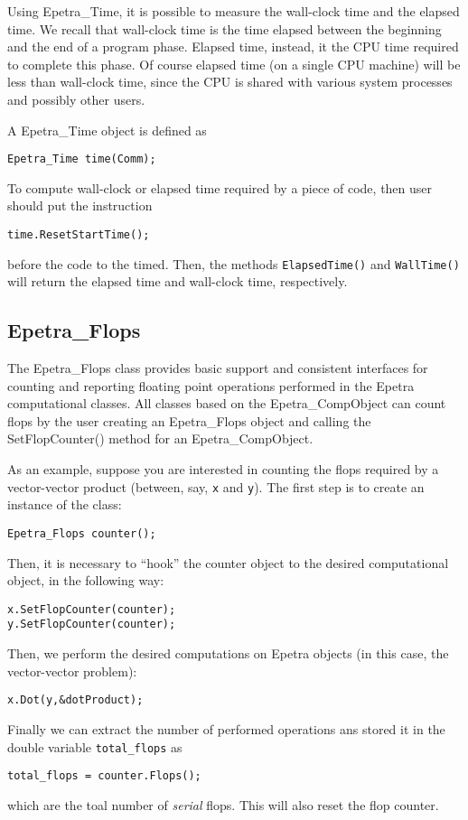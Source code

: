 Using Epetra\_Time, it is possible to measure the wall-clock time and
the elapsed time. We recall that wall-clock time is the time elapsed
between the beginning and the end of a program phase. Elapsed time,
instead, it the CPU time required to complete this phase. Of course
elapsed time (on a single CPU machine) will be less than wall-clock
time, since the CPU is shared with various system processes and possibly
other users.

A Epetra\_Time object is defined as
\begin{verbatim}
Epetra_Time time(Comm);
\end{verbatim}
To compute wall-clock or elapsed time required by a piece of code,
then user should put the instruction
\begin{verbatim}
time.ResetStartTime();
\end{verbatim}
before the code to the timed. Then, 
the methods \verb!ElapsedTime()! and \verb!WallTime()! will return the
elapsed time and wall-clock time, respectively.


\subsection{Epetra\_Flops}
\label{sec:flops}

The Epetra\_Flops class provides basic support and consistent interfaces
for counting and reporting floating point operations performed in the
Epetra computational classes. All classes based on the
Epetra\_CompObject can count flops by the user creating an Epetra\_Flops
object and calling the SetFlopCounter() method for an
Epetra\_CompObject.

As an example, suppose you are interested in counting the flops required
by a vector-vector product (between, say, \verb!x! and \verb!y!).  The
first step is to create an instance of the class:
\begin{verbatim}
Epetra_Flops counter();
\end{verbatim}
Then, it is necessary to ``hook'' the counter object to the desired
computational object, in the following way:
\begin{verbatim}
x.SetFlopCounter(counter);
y.SetFlopCounter(counter);
\end{verbatim}
Then, we perform the desired computations on Epetra objects (in this
case, the vector-vector problem):
\begin{verbatim}
x.Dot(y,&dotProduct);
\end{verbatim}
Finally we can extract the number of performed operations ans stored it
in the double variable \verb!total_flops! as
\begin{verbatim}
total_flops = counter.Flops();
\end{verbatim}
which are the toal number of {\sl serial} flops. This will also reset
the flop counter.


